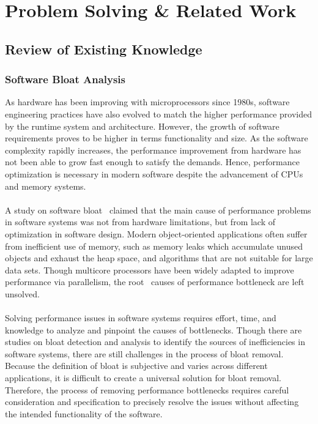 \section{Problem Solving \& Related Work}
\label{sec:problem-solving-related-work}

\subsection{Review of Existing Knowledge}
\label{subsec:review-of-existing-knowledge}

\subsubsection*{Software Bloat Analysis}

As hardware has been improving with microprocessors since 1980s, software engineering practices have 
also evolved to match the higher performance provided by the runtime system and architecture.
However, the growth of software requirements proves to be higher in terms functionality and size.
As the software complexity rapidly increases, the performance improvement from hardware has not been 
able to grow fast enough to satisfy the demands.
Hence, performance optimization is necessary in modern software despite the advancement of CPUs and 
memory systems.
\\\\
A study on software bloat~\cite{Software_Bloat_Analysis} claimed that the main cause of performance 
problems in software systems was not from hardware limitations, but from lack of optimization in software design.
Modern object-oriented applications often suffer from inefficient use of memory, such as memory leaks 
which accumulate unused objects and exhaust the heap space, and algorithms that are not suitable for 
large data sets.
Though multicore processors have been widely adapted to improve performance via parallelism, the root \
causes of performance bottleneck are left unsolved.
\\\\
Solving performance issues in software systems requires effort, time, and knowledge to analyze and 
pinpoint the causes of bottlenecks.
Though there are studies on bloat detection and analysis to identify the sources of inefficiencies 
in software systems, there are still challenges in the process of bloat removal.
Because the definition of bloat is subjective and varies across different applications, it is difficult 
to create a universal solution for bloat removal.
Therefore, the process of removing performance bottlenecks requires careful consideration and specification 
to precisely resolve the issues without affecting the intended functionality of the software.

